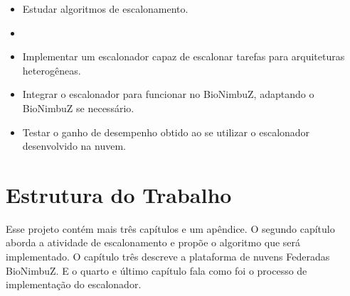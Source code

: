 \begin{itemize}
	\item Estudar algoritmos de escalonamento.
	\item 
	\item Implementar um escalonador capaz de escalonar tarefas para arquiteturas heterogêneas.
	\item Integrar o escalonador para funcionar no BioNimbuZ, adaptando o BioNimbuZ se necessário.
	\item Testar o ganho de desempenho obtido ao se utilizar o escalonador desenvolvido na nuvem.
\end{itemize}

\section{Estrutura do Trabalho}
Esse projeto contém mais três capítulos e um apêndice. O segundo capítulo aborda a atividade de escalonamento e propõe o algoritmo que será implementado. O capítulo três descreve a plataforma de nuvens Federadas BioNimbuZ. E o quarto e último capítulo fala como foi o processo de implementação do escalonador.